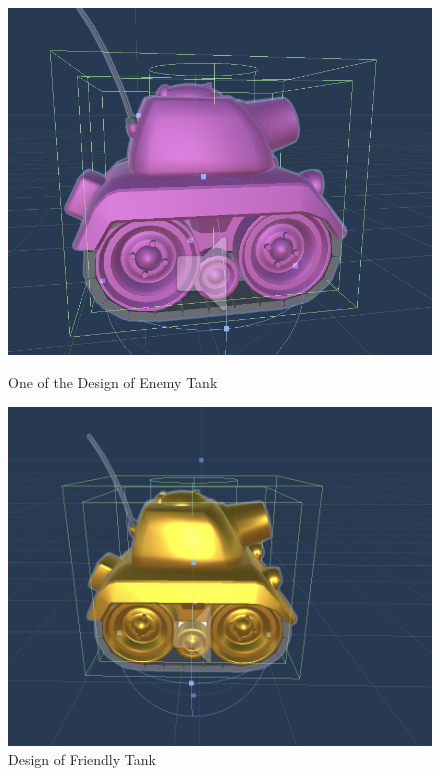 \begin{figure}[t]
\centering
\begin{multicols}{3}
\includegraphics[width=0.99\columnwidth]{Chapter2/enemy_tank.png}\par
\caption{One of the Design of Enemy Tank}
\label{fig:enemy}


\includegraphics[width=0.99\columnwidth]{Chapter2/friendly_tank.png}\par
\caption{Design of Friendly Tank}
\label{fig:friendly}


\end{multicols}
\end{figure}

